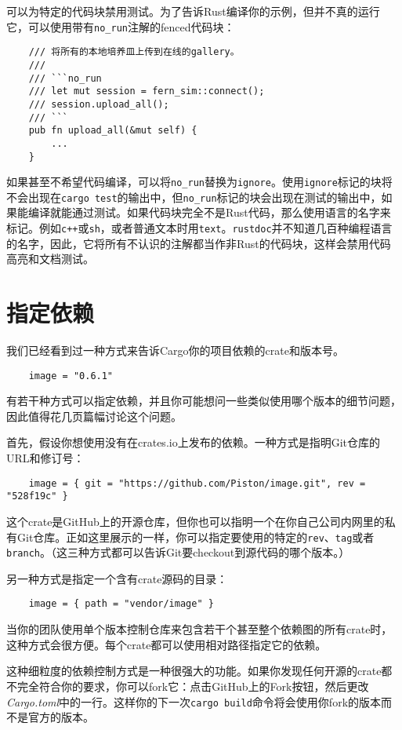 可以为特定的代码块禁用测试。为了告诉Rust编译你的示例，但并不真的运行它，可以使用带有\texttt{no\_run}注解的fenced代码块：
\begin{verbatim}
    /// 将所有的本地培养皿上传到在线的gallery。
    ///
    /// ```no_run
    /// let mut session = fern_sim::connect();
    /// session.upload_all();
    /// ```
    pub fn upload_all(&mut self) {
        ...
    }
\end{verbatim}

如果甚至不希望代码编译，可以将\texttt{no\_run}替换为\texttt{ignore}。使用\texttt{ignore}标记的块将不会出现在\texttt{cargo test}的输出中，但\texttt{no\_run}标记的块会出现在测试的输出中，如果能编译就能通过测试。如果代码块完全不是Rust代码，那么使用语言的名字来标记。例如\texttt{c++}或\texttt{sh}，或者普通文本时用\texttt{text}。\texttt{rustdoc}并不知道几百种编程语言的名字，因此，它将所有不认识的注解都当作非Rust的代码块，这样会禁用代码高亮和文档测试。

\section{指定依赖}\label{depend}

我们已经看到过一种方式来告诉Cargo你的项目依赖的crate和版本号。
\begin{verbatim}
    image = "0.6.1"
\end{verbatim}

有若干种方式可以指定依赖，并且你可能想问一些类似使用哪个版本的细节问题，因此值得花几页篇幅讨论这个问题。

首先，假设你想使用没有在crates.io上发布的依赖。一种方式是指明Git仓库的URL和修订号：
\begin{verbatim}
    image = { git = "https://github.com/Piston/image.git", rev = "528f19c" }
\end{verbatim}

这个crate是GitHub上的开源仓库，但你也可以指明一个在你自己公司内网里的私有Git仓库。正如这里展示的一样，你可以指定要使用的特定的\texttt{rev}、\texttt{tag}或者\texttt{branch}。（这三种方式都可以告诉Git要checkout到源代码的哪个版本。）

另一种方式是指定一个含有crate源码的目录：
\begin{verbatim}
    image = { path = "vendor/image" }
\end{verbatim}

当你的团队使用单个版本控制仓库来包含若干个甚至整个依赖图的所有crate时，这种方式会很方便。每个crate都可以使用相对路径指定它的依赖。

这种细粒度的依赖控制方式是一种很强大的功能。如果你发现任何开源的crate都不完全符合你的要求，你可以fork它：点击GitHub上的Fork按钮，然后更改\emph{Cargo.toml}中的一行。这样你的下一次\texttt{cargo build}命令将会使用你fork的版本而不是官方的版本。

